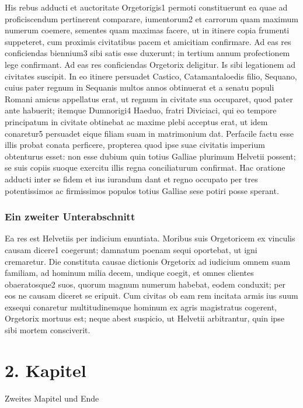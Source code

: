 His rebus adducti et auctoritate Orgetorigis1 permoti constituerunt ea quae ad
proficiscendum pertinerent comparare, iumentorum2 et carrorum quam maximum
numerum coemere, sementes quam maximas facere, ut in itinere copia frumenti
suppeteret, cum proximis civitatibus pacem et amicitiam confirmare. Ad eas res
conficiendas biennium3 sibi satis esse duxerunt; in tertium annum profectionem
lege confirmant. Ad eas res conficiendas Orgetorix deligitur. Is sibi legationem
ad civitates suscipit. In eo itinere persuadet Castico, Catamantaloedis filio,
Sequano, cuius pater regnum in Sequanis multos annos obtinuerat et a senatu
populi Romani amicus appellatus erat, ut regnum in civitate sua occuparet, quod
pater ante habuerit; itemque Dumnorigi4 Haeduo, fratri Diviciaci, qui eo tempore
principatum in civitate obtinebat ac maxime plebi acceptus erat, ut idem
conaretur5 persuadet eique filiam suam in matrimonium dat. Perfacile factu esse
illis probat conata perficere, propterea quod ipse suae civitatis imperium
obtenturus esset: non esse dubium quin totius Galliae plurimum Helvetii possent;
se suis copiis suoque exercitu illis regna conciliaturum confirmat. Hac oratione
adducti inter se fidem et ius iurandum dant et regno occupato per tres
potentissimos ac firmissimos populos totius Galliae sese potiri posse sperant. 

\subsection{Ein zweiter Unterabschnitt}

Ea res est Helvetiis per indicium enuntiata. Moribus suis Orgetoricem ex
vinculis causam dicere1 coegerunt; damnatum poenam sequi oportebat, ut igni
cremaretur. Die constituta causae dictionis Orgetorix ad iudicium omnem suam
familiam, ad hominum milia decem, undique coegit, et omnes clientes
obaeratosque2 suos, quorum magnum numerum habebat, eodem conduxit; per eos ne
causam diceret se eripuit. Cum civitas ob eam rem incitata armis ius suum
exsequi conaretur multitudinemque hominum ex agris magistratus cogerent,
Orgetorix mortuus est; neque abest suspicio, ut Helvetii arbitrantur, quin ipse
sibi mortem consciverit. 

\chapter{2. Kapitel}

Zweites Mapitel und Ende



